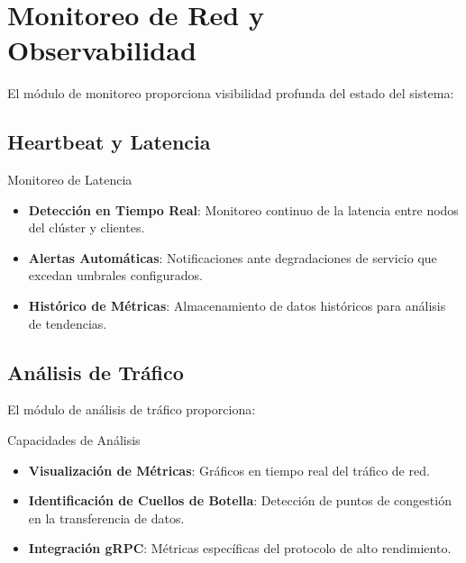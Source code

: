\section{Monitoreo de Red y Observabilidad}

El módulo de monitoreo proporciona visibilidad profunda del estado del sistema:

\subsection{Heartbeat y Latencia}

\begin{caja}{Monitoreo de Latencia}
\begin{itemize}
\item \textbf{Detección en Tiempo Real}: Monitoreo continuo de la latencia entre nodos del clúster y clientes.
\item \textbf{Alertas Automáticas}: Notificaciones ante degradaciones de servicio que excedan umbrales configurados.
\item \textbf{Histórico de Métricas}: Almacenamiento de datos históricos para análisis de tendencias.
\end{itemize}
\end{caja}


\subsection{Análisis de Tráfico}

El módulo de análisis de tráfico proporciona:

\begin{caja}{Capacidades de Análisis}
\begin{itemize}
\item \textbf{Visualización de Métricas}: Gráficos en tiempo real del tráfico de red.
\item \textbf{Identificación de Cuellos de Botella}: Detección de puntos de congestión en la transferencia de datos.
\item \textbf{Integración gRPC}: Métricas específicas del protocolo de alto rendimiento.
\end{itemize}
\end{caja}


